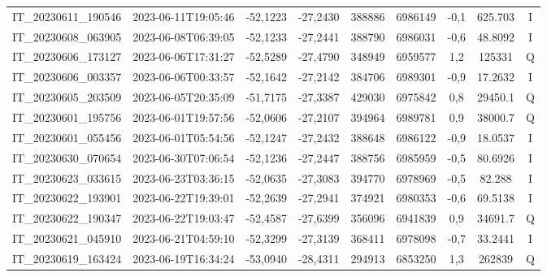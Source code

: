 \begin{center}
\begin{longtable}{ccccS[table-format=6.0]S[table-format=7.0]ccc}
IT\_20230611\_190546 & 2023-06-11T19:05:46 & -52,1223 & -27,2430 & 388886 & 6986149 & -0,1 & \num[round-precision=3,round-mode=figures,scientific-notation=true]{625.703} & I \\
IT\_20230608\_063905 & 2023-06-08T06:39:05 & -52,1233 & -27,2441 & 388790 & 6986031 & -0,6 & \num[round-precision=3,round-mode=figures,scientific-notation=true]{48.8092} & I \\
IT\_20230606\_173127 & 2023-06-06T17:31:27 & -52,5289 & -27,4790 & 348949 & 6959577 & 1,2 & \num[round-precision=3,round-mode=figures,scientific-notation=true]{125331} & Q \\
IT\_20230606\_003357 & 2023-06-06T00:33:57 & -52,1642 & -27,2142 & 384706 & 6989301 & -0,9 & \num[round-precision=3,round-mode=figures,scientific-notation=true]{17.2632} & I \\
IT\_20230605\_203509 & 2023-06-05T20:35:09 & -51,7175 & -27,3387 & 429030 & 6975842 & 0,8 & \num[round-precision=3,round-mode=figures,scientific-notation=true]{29450.1} & Q \\
IT\_20230601\_195756 & 2023-06-01T19:57:56 & -52,0606 & -27,2107 & 394964 & 6989781 & 0,9 & \num[round-precision=3,round-mode=figures,scientific-notation=true]{38000.7} & Q \\
IT\_20230601\_055456 & 2023-06-01T05:54:56 & -52,1247 & -27,2432 & 388648 & 6986122 & -0,9 & \num[round-precision=3,round-mode=figures,scientific-notation=true]{18.0537} & I \\
IT\_20230630\_070654 & 2023-06-30T07:06:54 & -52,1236 & -27,2447 & 388756 & 6985959 & -0,5 & \num[round-precision=3,round-mode=figures,scientific-notation=true]{80.6926} & I \\
IT\_20230623\_033615 & 2023-06-23T03:36:15 & -52,0635 & -27,3083 & 394770 & 6978969 & -0,5 & \num[round-precision=3,round-mode=figures,scientific-notation=true]{82.288} & I \\
IT\_20230622\_193901 & 2023-06-22T19:39:01 & -52,2639 & -27,2941 & 374921 & 6980353 & -0,6 & \num[round-precision=3,round-mode=figures,scientific-notation=true]{69.5138} & I \\
IT\_20230622\_190347 & 2023-06-22T19:03:47 & -52,4587 & -27,6399 & 356096 & 6941839 & 0,9 & \num[round-precision=3,round-mode=figures,scientific-notation=true]{34691.7} & Q \\
IT\_20230621\_045910 & 2023-06-21T04:59:10 & -52,3299 & -27,3139 & 368411 & 6978098 & -0,7 & \num[round-precision=3,round-mode=figures,scientific-notation=true]{33.2441} & I \\
IT\_20230619\_163424 & 2023-06-19T16:34:24 & -53,0940 & -28,4311 & 294913 & 6853250 & 1,3 & \num[round-precision=3,round-mode=figures,scientific-notation=true]{262839} & Q \\

\end{longtable}
\end{center}
